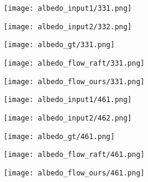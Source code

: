 \documentclass[10pt,twocolumn,letterpaper]{article}
\begin{document}
\begin{figure*}[ht!]
     \begin{subfigure}[b]{0.195\textwidth}
         \centering
         \texttt{[image: albedo\_input1/331.png]}
     \end{subfigure}\hfill
     \begin{subfigure}[b]{0.195\textwidth}
         \centering
         \texttt{[image: albedo\_input2/332.png]}
     \end{subfigure}\hfill
     \begin{subfigure}[b]{0.195\textwidth}
         \centering
         \texttt{[image: albedo\_gt/331.png]}
     \end{subfigure}\hfill
     \begin{subfigure}[b]{0.195\textwidth}
         \centering
         \texttt{[image: albedo\_flow\_raft/331.png]}
     \end{subfigure}\hfill
     \begin{subfigure}[b]{0.195\textwidth}
         \centering
         \texttt{[image: albedo\_flow\_ours/331.png]}
     \end{subfigure}

     \begin{subfigure}[b]{0.195\textwidth}
         \centering
         \texttt{[image: albedo\_input1/461.png]}
     \end{subfigure}\hfill
     \begin{subfigure}[b]{0.195\textwidth}
         \centering
         \texttt{[image: albedo\_input2/462.png]}
     \end{subfigure}\hfill
     \begin{subfigure}[b]{0.195\textwidth}
         \centering
         \texttt{[image: albedo\_gt/461.png]}
     \end{subfigure}\hfill
     \begin{subfigure}[b]{0.195\textwidth}
         \centering
         \texttt{[image: albedo\_flow\_raft/461.png]}
     \end{subfigure}\hfill
     \begin{subfigure}[b]{0.195\textwidth}
         \centering
         \texttt{[image: albedo\_flow\_ours/461.png]}
     \end{subfigure}


\end{figure*}
\end{document}
